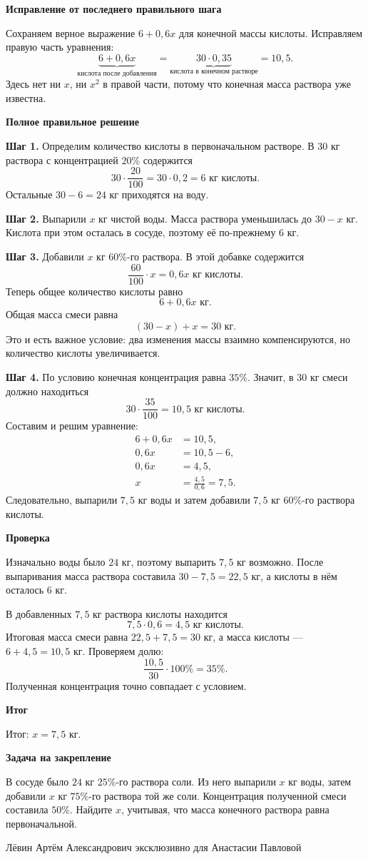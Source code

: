 \documentclass[12pt,a4paper]{article}
\newcommand{\subblock}[1]{\vspace{4pt}\noindent\textbf{#1}\par}
\begin{document}
\subblock{Исправление от последнего правильного шага}
Сохраняем верное выражение $6+0{,}6x$ для конечной массы кислоты.
Исправляем правую часть уравнения:
\[
\underbrace{6+0{,}6x}_{\text{кислота после добавления}}
=\underbrace{30\cdot0{,}35}_{\text{кислота в конечном растворе}}
=10{,}5.
\]
Здесь нет ни $x$, ни $x^2$ в правой части, потому что конечная масса
раствора уже известна.

\subblock{Полное правильное решение}
\textbf{Шаг 1.} Определим количество кислоты в первоначальном
растворе. В $30$ кг раствора с концентрацией $20\%$ содержится
\[
30\cdot\frac{20}{100}=30\cdot0{,}2=6\text{ кг кислоты}.
\]
Остальные $30-6=24$ кг приходятся на воду.

\textbf{Шаг 2.} Выпарили $x$ кг чистой воды. Масса раствора
уменьшилась до $30-x$ кг. Кислота при этом осталась в сосуде,
поэтому её по-прежнему $6$ кг.

\textbf{Шаг 3.} Добавили $x$ кг $60\%$-го раствора.
В этой добавке содержится
\[
\frac{60}{100}\cdot x=0{,}6x\text{ кг кислоты}.
\]
Теперь общее количество кислоты равно
\[
6+0{,}6x\text{ кг}.
\]
Общая масса смеси равна
\[
(30-x)+x=30\text{ кг}.
\]
Это и есть важное условие: два изменения массы взаимно
компенсируются, но количество кислоты увеличивается.

\textbf{Шаг 4.} По условию конечная концентрация равна $35\%$.
Значит, в $30$ кг смеси должно находиться
\[
30\cdot\frac{35}{100}=10{,}5\text{ кг кислоты}.
\]
Составим и решим уравнение:
\begin{align*}
6+0{,}6x&=10{,}5,\\
0{,}6x&=10{,}5-6,\\
0{,}6x&=4{,}5,\\
x&=\frac{4{,}5}{0{,}6}=7{,}5.
\end{align*}
Следовательно, выпарили $7{,}5$ кг воды и затем добавили
$7{,}5$ кг $60\%$-го раствора кислоты.

\subblock{Проверка}
Изначально воды было $24$ кг, поэтому выпарить $7{,}5$ кг
возможно. После выпаривания масса раствора
составила $30-7{,}5=22{,}5$ кг, а кислоты в нём осталось $6$ кг.

В добавленных $7{,}5$ кг раствора кислоты находится
\[
7{,}5\cdot0{,}6=4{,}5\text{ кг кислоты}.
\]
Итоговая масса смеси равна $22{,}5+7{,}5=30$ кг,
а масса кислоты --- $6+4{,}5=10{,}5$ кг. Проверяем долю:
\[
\frac{10{,}5}{30}\cdot100\%=35\%.
\]
Полученная концентрация точно совпадает с условием.

\subblock{Итог}
\textcolor{teal!60!black}{Итог:} $x=7{,}5$ кг.

\subblock{Задача на закрепление}
В сосуде было $24$ кг $25\%$-го раствора соли.
Из него выпарили $x$ кг воды, затем добавили $x$ кг
$75\%$-го раствора той же соли. Концентрация полученной смеси
составила $50\%$. Найдите $x$, учитывая, что масса конечного
раствора равна первоначальной.

\vfill
\begin{center}
\small Лёвин Артём Александрович эксклюзивно для Анастасии Павловой
\end{center}
\end{document}
